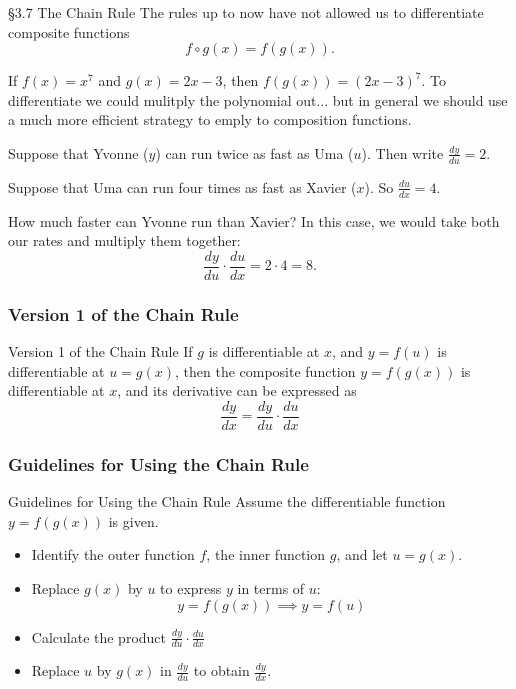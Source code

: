 \documentclass[cal1spr16Lectures.tex]{subfiles}
\begin{document}
\begin{frame}{\S 3.7 The Chain Rule}\footnotesize
The rules up to now have not allowed us to differentiate composite functions 
\[
f\circ g(x)=f(g(x)).
\]
\begin{ex}
If $f(x)=x^7$ and $g(x)=2x-3$, then $f(g(x))=(2x-3)^7$.  To differentiate we could mulitply the polynomial out... but in general we should use a much more efficient strategy to emply to composition functions. 
\end{ex}
\end{frame}

\begin{frame}\footnotesize
\begin{ex}
Suppose that Yvonne ($y$) can run twice as fast as Uma ($u$). Then write $\textstyle\frac{dy}{du}=2$.

\vspace{0.5pc}
Suppose that Uma can run four times as fast as Xavier ($x$).  So $\textstyle\frac{du}{dx}=4$.

\vspace{1pc}
How much faster can Yvonne run than Xavier?  In this case, we would take both our rates and multiply them together:
\[\frac{dy}{du} \cdot \frac{du}{dx}=2 \cdot 4 = 8.\]
\end{ex}
\end{frame}

\subsubsection{Version 1 of the Chain Rule}

\begin{frame}{\small Version 1 of the Chain Rule}
If $g$ is differentiable at $x$, and $y=f(u)$ is differentiable at $u=g(x)$, then the composite function $y=f(g(x))$ is differentiable at $x$, and its derivative can be expressed as 
\[\frac{dy}{dx}=\frac{dy}{du} \cdot \frac{du}{dx}\]
\end{frame}

\subsubsection{Guidelines for Using the Chain Rule}

\begin{frame}{\small Guidelines for Using the Chain Rule}\footnotesize
Assume the differentiable function $y=f(g(x))$ is given.
\begin{itemize}
	\item[1.] Identify the outer function $f$, the inner function $g$, and let $u=g(x).$
	\item[2.] Replace $g(x)$ by $u$ to express $y$ in terms of $u$:
	\[y=f(g(x)) \implies y=f(u)\]
	\item[3.]  Calculate the product $\frac{dy}{du} \cdot \frac{du}{dx}$
	\item[4.] Replace $u$ by $g(x)$ in $\frac{dy}{du}$ to obtain $\frac{dy}{dx}.$
\end{itemize}
\end{frame}
\end{document}
